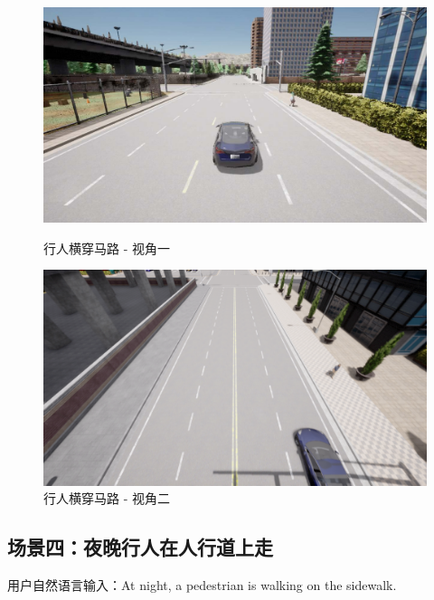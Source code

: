 \vspace{1em}

\begin{figure}[H]
	\centering
	\begin{minipage}[t]{0.48\textwidth}
		\centering
		\includegraphics[width=\linewidth]{"images/场景8.pdf"}
		\caption{行人横穿马路 - 视角一}
		\label{fig:scene8_1}
	\end{minipage}%
	\hfill
	\begin{minipage}[t]{0.48\textwidth}
		\centering
		\includegraphics[width=\linewidth]{"images/场景8.1.png"}
		\caption{行人横穿马路 - 视角二}
		\label{fig:scene8_2}
	\end{minipage}
\end{figure}

\subsection{场景四：夜晚行人在人行道上走}
用户自然语言输入：\indent At night, a pedestrian is walking on the sidewalk.\\

